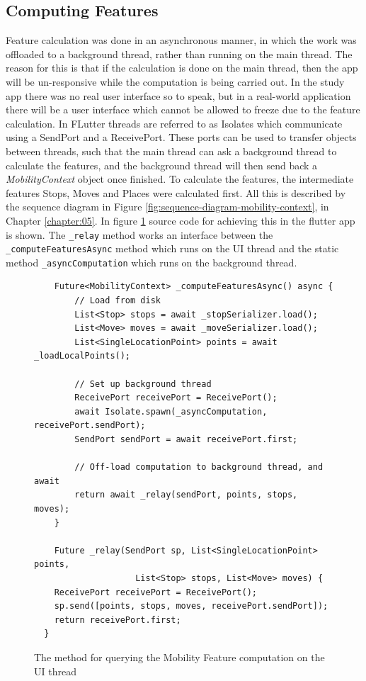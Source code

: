 \subsection{Computing Features}
Feature calculation was done in an asynchronous manner, in which the work was offloaded to a background thread, rather than running on the main thread. The reason for this is that if the calculation is done on the main thread, then the app will be un-responsive while the computation is being carried out. In the study app there was no real user interface so to speak, but in a real-world application there will be a user interface which cannot be allowed to freeze due to the feature calculation. In FLutter threads are referred to as Isolates which communicate using a SendPort and a ReceivePort. These ports can be used to transfer objects between threads, such that the main thread can ask a background thread to calculate the features, and the background thread will then send back a \textit{MobilityContext} object once finished. To calculate the features, the intermediate features Stops, Moves and Places were calculated first. All this is described by the sequence diagram in Figure \ref{fig:sequence-diagram-mobility-context}, in Chapter \ref{chapter:05}. In figure \ref{fig:feature-comutation-code} source code for achieving this in the flutter app is shown. The \verb|_relay| method works an interface between the \verb|_computeFeaturesAsync| method which runs on the UI thread and the static method \verb|_asyncComputation| which runs on the background thread.


\begin{figure}
    \centering
    \begin{verbatim}
    Future<MobilityContext> _computeFeaturesAsync() async {
        // Load from disk
        List<Stop> stops = await _stopSerializer.load();
        List<Move> moves = await _moveSerializer.load();
        List<SingleLocationPoint> points = await _loadLocalPoints();
        
        // Set up background thread
        ReceivePort receivePort = ReceivePort();
        await Isolate.spawn(_asyncComputation, receivePort.sendPort);
        SendPort sendPort = await receivePort.first;
        
        // Off-load computation to background thread, and await
        return await _relay(sendPort, points, stops, moves);
    }
    
    Future _relay(SendPort sp, List<SingleLocationPoint> points, 
                    List<Stop> stops, List<Move> moves) {
    ReceivePort receivePort = ReceivePort();
    sp.send([points, stops, moves, receivePort.sendPort]);
    return receivePort.first;
  }
    \end{verbatim}
    \caption{The method for querying the Mobility Feature computation on the UI thread}
    \label{fig:feature-comutation-code}
\end{figure}


